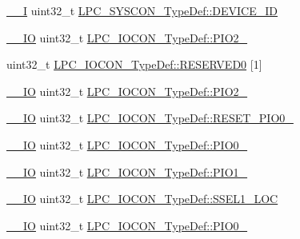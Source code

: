 \begin{DoxyCompactItemize}
\item 
\hyperlink{group___c_m_s_i_s__core__definitions_gaf63697ed9952cc71e1225efe205f6cd3}{\+\_\+\+\_\+I} uint32\+\_\+t \hyperlink{group___l_p_c11xx___definitions_ga4ab05124b010cfedcc6af2f10290cb27}{L\+P\+C\+\_\+\+S\+Y\+S\+C\+O\+N\+\_\+\+Type\+Def\+::\+D\+E\+V\+I\+C\+E\+\_\+\+ID}
\item 
\hyperlink{group___c_m_s_i_s__core__definitions_gaec43007d9998a0a0e01faede4133d6be}{\+\_\+\+\_\+\+IO} uint32\+\_\+t \hyperlink{group___l_p_c11xx___definitions_gaaaca8c6a8f0ee9eadc44aefbcde5999d}{L\+P\+C\+\_\+\+I\+O\+C\+O\+N\+\_\+\+Type\+Def\+::\+P\+I\+O2\+\_}
\item 
uint32\+\_\+t \hyperlink{group___l_p_c11xx___definitions_gae0c9ad1b3c2f523a2ae17423b3e14f39}{L\+P\+C\+\_\+\+I\+O\+C\+O\+N\+\_\+\+Type\+Def\+::\+R\+E\+S\+E\+R\+V\+E\+D0} \mbox{[}1\mbox{]}
\item 
\hyperlink{group___c_m_s_i_s__core__definitions_gaec43007d9998a0a0e01faede4133d6be}{\+\_\+\+\_\+\+IO} uint32\+\_\+t \hyperlink{group___l_p_c11xx___definitions_ga527d194efec901713ea175d5d735601c}{L\+P\+C\+\_\+\+I\+O\+C\+O\+N\+\_\+\+Type\+Def\+::\+P\+I\+O2\+\_}
\item 
\hyperlink{group___c_m_s_i_s__core__definitions_gaec43007d9998a0a0e01faede4133d6be}{\+\_\+\+\_\+\+IO} uint32\+\_\+t \hyperlink{group___l_p_c11xx___definitions_gab69af896ceb6c10b8f9de41aa033da88}{L\+P\+C\+\_\+\+I\+O\+C\+O\+N\+\_\+\+Type\+Def\+::\+R\+E\+S\+E\+T\+\_\+\+P\+I\+O0\+\_}
\item 
\hyperlink{group___c_m_s_i_s__core__definitions_gaec43007d9998a0a0e01faede4133d6be}{\+\_\+\+\_\+\+IO} uint32\+\_\+t \hyperlink{group___l_p_c11xx___definitions_ga1be433c8d0d4b04d48d7435990640b82}{L\+P\+C\+\_\+\+I\+O\+C\+O\+N\+\_\+\+Type\+Def\+::\+P\+I\+O0\+\_}
\item 
\hyperlink{group___c_m_s_i_s__core__definitions_gaec43007d9998a0a0e01faede4133d6be}{\+\_\+\+\_\+\+IO} uint32\+\_\+t \hyperlink{group___l_p_c11xx___definitions_ga7b21ecfdd70f25fde6090d50447fba94}{L\+P\+C\+\_\+\+I\+O\+C\+O\+N\+\_\+\+Type\+Def\+::\+P\+I\+O1\+\_}
\item 
\hyperlink{group___c_m_s_i_s__core__definitions_gaec43007d9998a0a0e01faede4133d6be}{\+\_\+\+\_\+\+IO} uint32\+\_\+t \hyperlink{group___l_p_c11xx___definitions_gade4b6c37c371658c818344930384b993}{L\+P\+C\+\_\+\+I\+O\+C\+O\+N\+\_\+\+Type\+Def\+::\+S\+S\+E\+L1\+\_\+\+L\+OC}
\item 
\hyperlink{group___c_m_s_i_s__core__definitions_gaec43007d9998a0a0e01faede4133d6be}{\+\_\+\+\_\+\+IO} uint32\+\_\+t \hyperlink{group___l_p_c11xx___definitions_ga21ff4df0d6572840ce3f9613fe1c5ef0}{L\+P\+C\+\_\+\+I\+O\+C\+O\+N\+\_\+\+Type\+Def\+::\+P\+I\+O0\+\_}

\end{DoxyCompactItemize}
